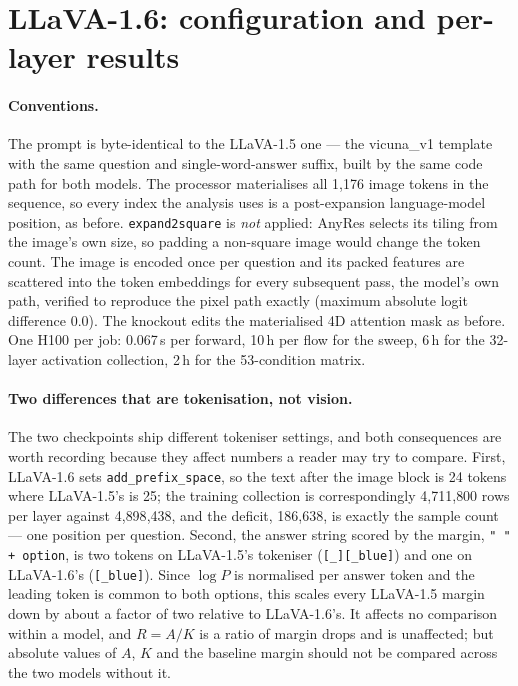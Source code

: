 \documentclass[11pt,a4paper]{article}
\begin{document}
\ifdefined\llavasixstandalone\appendix\fi
\section{LLaVA-1.6: configuration and per-layer results}
\label{app:llava16}

\paragraph{Conventions.} The prompt is byte-identical to the LLaVA-1.5 one --- the
vicuna\_v1 template with the same question and single-word-answer suffix, built by
the same code path for both models. The processor materialises all 1{,}176 image
tokens in the sequence, so every index the analysis uses is a post-expansion
language-model position, as before. \texttt{expand2square} is \emph{not} applied:
AnyRes selects its tiling from the image's own size, so padding a non-square image
would change the token count. The image is encoded once per question and its
packed features are scattered into the token embeddings for every subsequent pass,
the model's own path, verified to reproduce the pixel path exactly (maximum
absolute logit difference 0.0). The knockout edits the materialised 4D attention
mask as before. One H100 per job: 0.067\,s per forward, 10\,h per flow for the
sweep, 6\,h for the 32-layer activation collection, 2\,h for the 53-condition
matrix.

\paragraph{Two differences that are tokenisation, not vision.} The two checkpoints
ship different tokeniser settings, and both consequences are worth recording
because they affect numbers a reader may try to compare. First, LLaVA-1.6 sets
\texttt{add\_prefix\_space}, so the text after the image block is 24 tokens where
LLaVA-1.5's is 25; the training collection is correspondingly 4{,}711{,}800 rows
per layer against 4{,}898{,}438, and the deficit, 186{,}638, is exactly the
sample count --- one position per question. Second, the answer string scored by
the margin, \texttt{" " + option}, is two tokens on LLaVA-1.5's tokeniser
(\texttt{[\_][\_blue]}) and one on LLaVA-1.6's (\texttt{[\_blue]}). Since
$\log P$ is normalised per answer token and the leading token is common to both
options, this scales every LLaVA-1.5 margin down by about a factor of two
relative to LLaVA-1.6's. It affects no comparison within a model, and $R = A/K$
is a ratio of margin drops and is unaffected; but absolute values of $A$, $K$ and
the baseline margin should not be compared across the two models without it.
\end{document}
